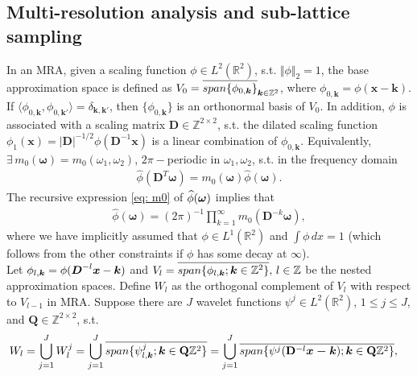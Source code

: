 \subsection{Multi-resolution analysis and sub-lattice sampling}
In an MRA, given a scaling function $\phi\in L^2(\mathbb{R}^2)$, s.t. $\Vert\phi\Vert_2=1$,
the base approximation space is defined as $V_0 = \overlinespace{span\{\phi_{0,\boldsymbol{k}}\}}_{\boldsymbol{k}\in\mathbb{Z}^2}$, where $\phi_{0,\boldsymbol{k}} = \phi(\boldsymbol{x}-\boldsymbol{k})$. If $\langle \phi_{0,\boldsymbol{k}},\phi_{0,\boldsymbol{k'}}\rangle = \delta_{\boldsymbol{k,k'}}$, then $\{\phi_{0,\boldsymbol{k}}\}$ is an orthonormal basis of $V_0$. In addition, $\phi$ is associated with a scaling matrix $\mathbf{D}\in\mathbb{Z}^{2\times 2}$, s.t. the dilated scaling function
 $\phi_1(\boldsymbol{x}) = |\mathbf{D}|^{-1/2}\phi(\mathbf{D}^{-1}\boldsymbol{x})$ is a linear combination of $\phi_{0,\boldsymbol{k}}$.
Equivalently, $\exists\,m_0(\boldsymbol{\omega}) = m_0(\omega_1,\omega_2)$, $2\pi-$periodic in $\omega_1,\omega_2$, s.t. in the frequency domain
\begin{align}\label{eq: m0}
\widehat{\phi}(\mathbf{D}^T\boldsymbol{\omega}) = m_0(\boldsymbol{\omega})\widehat{\phi}(\boldsymbol{\omega}).
\end{align}
The recursive expression \eqref{eq: m0} of $\widehat{\phi}(\boldsymbol{\omega})$ implies that
\begin{align}\label{eq: phi-m0}
\textstyle \widehat{\phi}(\boldsymbol{\omega}) = (2\pi)^{-1}\prod_{k=1}^{\infty}m_0(\mathbf{D}^{-k} \boldsymbol{\omega}),
\end{align}
where we have implicitly assumed that $\phi\in L^1(\mathbb{R}^2)$ and $\int\phi\,dx = 1$ (which follows from the other constraints if $\phi$ has some decay at $\infty$).
\\[.2em]
Let $\phi_{l,\boldsymbol{k}} = \phi(\boldsymbol{D}^{-l}\boldsymbol{x}-\boldsymbol{k})$
and $V_l = \overlinespace{span\{\phi_{l,\boldsymbol{k}};\boldsymbol{k}\in\mathbb{Z}^2\}},\,l\in\mathbb{Z}$ be the nested approximation spaces. Define $W_l$ as the orthogonal complement of $V_l$ with respect to $V_{l-1}$ in MRA. 
Suppose there are $J$ wavelet functions $\psi^j\in L^2(\mathbb{R}^2)$, {\small $1 \leq j \leq J$}, and $\mathbf{Q}\in\mathbb{Z}^{2\times2}$, s.t.
\begin{align*}
\hspace{-1em} W_l = \bigcup_{j=1}^J W_l^j = \bigcup_{j=1}^J \overline{span\{\psi^j_{l,\boldsymbol{k}};\boldsymbol{ k}\in \mathbf{Q}\mathbb{Z}^2\}}= \bigcup_{j=1}^J \overline{span\{\psi^j(\mathbf{D}^{-l}\boldsymbol{x-k});\boldsymbol{ k}\in \mathbf{Q}\mathbb{Z}^2\}},
\end{align*}
